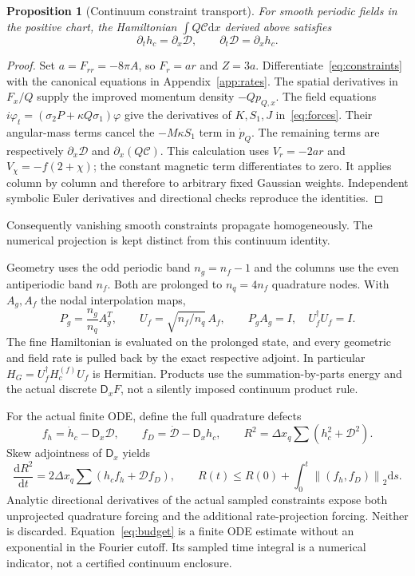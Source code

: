 \documentclass[11pt]{article}
\newcommand{\dd}{\mathrm{d}}
\newcommand{\norm}[1]{\left\lVert#1\right\rVert}
\newtheorem{proposition}{Proposition}
\begin{document}
\begin{proposition}[Continuum constraint transport]\label{prop:transport}
For smooth periodic fields in the positive chart, the Hamiltonian
$\int Q\mathcal C\dd x$ derived above satisfies
\begin{equation}\label{eq:constraintwaves}
\partial_t h_c=\partial_x\mathcal D,\qquad
\partial_t\mathcal D=\partial_xh_c.
\end{equation}
\end{proposition}
\begin{proof}
Set $a=F_{rr}=-8\pi A$, so $F_r=ar$ and $Z=3a$.
Differentiate~\eqref{eq:constraints} with the canonical equations in
Appendix~\ref{app:rates}. The spatial derivatives in $F_x/Q$ supply the
improved momentum density $-Qp_{Q,x}$. The field equations
$ i\varphi_t=(\sigma_2P+\kappa Q\sigma_1)\varphi$ give the derivatives of
$K,S_1,J$ in~\eqref{eq:forces}. Their angular-mass terms cancel the
$-M\kappa S_1$ term in $\dot p_Q$. The remaining terms are respectively
$\partial_x\mathcal D$ and $\partial_x(Q\mathcal C)$.
This calculation uses $V_r=-2ar$ and $V_\chi=-f(2+\chi)$; the constant
magnetic term differentiates to zero. It applies column by column and
therefore to arbitrary fixed Gaussian weights. Independent symbolic
Euler derivatives and directional checks reproduce the identities.
\end{proof}
Consequently vanishing smooth constraints propagate homogeneously.
The numerical projection is kept distinct from this continuum identity.

Geometry uses the odd periodic band $n_g=n_f-1$ and the columns use the
even antiperiodic band $n_f$. Both are prolonged to $n_q=4n_f$ quadrature
nodes. With $A_g,A_f$ the nodal interpolation maps,
\begin{equation}\label{eq:maps}
P_g=\frac{n_g}{n_q}A_g^T,\qquad
U_f=\sqrt{n_f/n_q}\,A_f,\qquad
P_gA_g=I,\quad U_f^\dagger U_f=I.
\end{equation}
The fine Hamiltonian is evaluated on the prolonged state, and every
geometric and field rate is pulled back by the exact respective adjoint.
In particular $H_G=U_f^\dagger H_c^{(f)}U_f$ is Hermitian.
Products use the summation-by-parts energy and the actual discrete
$\mathsf D_xF$, not a silently imposed continuum product rule.

For the actual finite ODE, define the full quadrature defects
\begin{equation}\label{eq:forcing}
f_h=\dot h_c-\mathsf D_x\mathcal D,\qquad
f_D=\dot{\mathcal D}-\mathsf D_xh_c,\qquad
R^2=\Delta x_q\sum(h_c^2+\mathcal D^2).
\end{equation}
Skew adjointness of $\mathsf D_x$ yields
\begin{equation}\label{eq:budget}
\frac{\dd R^2}{\dd t}=2\Delta x_q\sum(h_cf_h+\mathcal D f_D),\qquad
R(t)\le R(0)+\int_0^t\norm{(f_h,f_D)}_2\dd s.
\end{equation}
Analytic directional derivatives of the actual sampled constraints expose
both unprojected quadrature forcing and the additional rate-projection
forcing. Neither is discarded. Equation~\eqref{eq:budget} is a finite ODE
estimate without an exponential in the Fourier cutoff. Its sampled time
integral is a numerical indicator, not a certified continuum enclosure.
\end{document}
